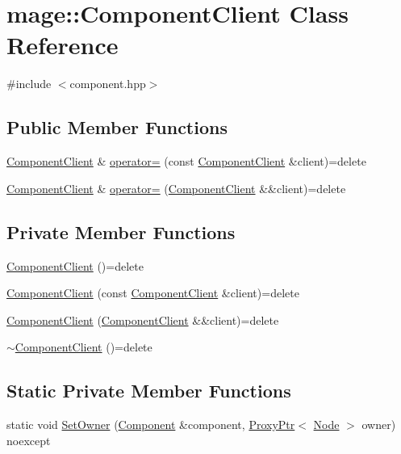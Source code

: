 \hypertarget{classmage_1_1_component_client}{}\section{mage\+:\+:Component\+Client Class Reference}
\label{classmage_1_1_component_client}


{\ttfamily \#include $<$component.\+hpp$>$}

\subsection*{Public Member Functions}
\begin{DoxyCompactItemize}
\item 
\hyperlink{classmage_1_1_component_client}{Component\+Client} \& \hyperlink{classmage_1_1_component_client_afababa2252823c58c9ddcc7ff6703b46}{operator=} (const \hyperlink{classmage_1_1_component_client}{Component\+Client} \&client)=delete
\item 
\hyperlink{classmage_1_1_component_client}{Component\+Client} \& \hyperlink{classmage_1_1_component_client_a6fa428db7961bc604b44710583563019}{operator=} (\hyperlink{classmage_1_1_component_client}{Component\+Client} \&\&client)=delete
\end{DoxyCompactItemize}
\subsection*{Private Member Functions}
\begin{DoxyCompactItemize}
\item 
\hyperlink{classmage_1_1_component_client_a745e1b2adcddb20ef288a6bda1ceecb9}{Component\+Client} ()=delete
\item 
\hyperlink{classmage_1_1_component_client_a5c8ba304aafac26964e36892cf19187c}{Component\+Client} (const \hyperlink{classmage_1_1_component_client}{Component\+Client} \&client)=delete
\item 
\hyperlink{classmage_1_1_component_client_a61b665792bc87ae0c1ffbb2a7c66d3d6}{Component\+Client} (\hyperlink{classmage_1_1_component_client}{Component\+Client} \&\&client)=delete
\item 
\hyperlink{classmage_1_1_component_client_a0f2f74a012d7aa1ad1fbef21b52da159}{$\sim$\+Component\+Client} ()=delete
\end{DoxyCompactItemize}
\subsection*{Static Private Member Functions}
\begin{DoxyCompactItemize}
\item 
static void \hyperlink{classmage_1_1_component_client_a268413a2179e0f29ac78b0c5f26ecaca}{Set\+Owner} (\hyperlink{classmage_1_1_component}{Component} \&component, \hyperlink{classmage_1_1_proxy_ptr}{Proxy\+Ptr}$<$ \hyperlink{classmage_1_1_node}{Node} $>$ owner) noexcept
\end{DoxyCompactItemize}
